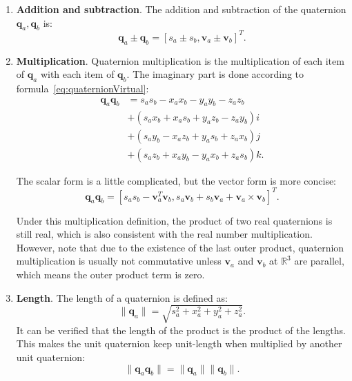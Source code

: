 \begin{enumerate}
    \item { \textbf{Addition and subtraction}.} The addition and subtraction of the quaternion $ \mathbf {q}_a, \mathbf {q}_b $ is:
    \begin{equation} 	
    \mathbf{q}_a \pm \mathbf{q}_b = \left[ s_a \pm s_b, \mathbf{v}_a \pm \mathbf{v}_b \right]^T.
    \end{equation}
    \item { \textbf {Multiplication}}. Quaternion multiplication is the multiplication of each item of $ \mathbf {q}_a $ with each item of $ \mathbf {q}_b $. The imaginary part is done according to  formula~\eqref {eq:quaternionVirtual}:
    \begin{equation}
    \begin{aligned}
    \mathbf{q}_a \mathbf{q}_b &= {s_a}{s_b} - {x_a}{x_b} - {y_a}{y_b} - {z_a}{z_b}\\
    &+ \left( {{s_a}{x_b} + {x_a}{s_b} + {y_a}{z_b} - {z_a}{y_b}} \right)i\\
    &+ \left( {{s_a}{y_b} - {x_a}{z_b} + {y_a}{s_b} + {z_a}{x_b}} \right)j\\
    &+ \left( {{s_a}{z_b} + {x_a}{y_b} - {y_a}{x_b} + {z_a}{s_b}} \right)k.
    \end{aligned}
    \end{equation}
    
    The scalar form is a little complicated, but the vector form is more concise:
    \begin{equation}
    \mathbf{q}_a \mathbf{q}_b = \left[ s_a s_b - \mathbf{v}_a^T \mathbf{v}_b, s_a\mathbf{v}_b + s_b\mathbf{v}_a + \mathbf{v}_a \times \mathbf{v}_b \right]^T.
    \end{equation}
    
    Under this multiplication definition, the product of two real quaternions is still real, which is also consistent with the real number multiplication. However, note that due to the existence of the last outer product, quaternion multiplication is usually not commutative unless $ \mathbf {v}_a $ and $ \mathbf {v}_b $ at $ \mathbb {R}^ 3 $ are parallel, which means the outer product term is zero.
    
    \item { \textbf {Length}. } The length of a quaternion is defined as:
    \begin{equation}
    \| \mathbf{q}_a \| = \sqrt{ s_a^2 + x_a^2 + y_a^2 + z_a^2 }.
    \end{equation}
    It can be verified that the length of the product is the product of the lengths. This makes the unit quaternion keep unit-length when multiplied by another unit quaternion:
    \begin{equation}
    \| \mathbf{q}_a \mathbf{q}_b \| = \|\mathbf{q}_a \| \| \mathbf{q}_b \|.
    \end{equation}
    

\end{enumerate}
